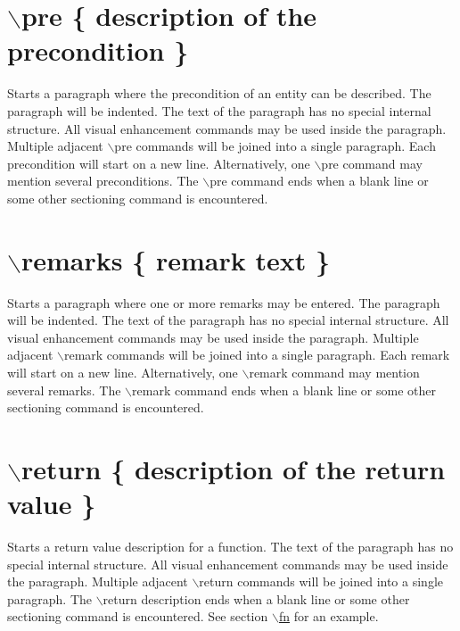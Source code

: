  \hypertarget{commands_cmdpre}{}\section{$\backslash$pre \{ description of the precondition \}}\label{commands_cmdpre}
 Starts a paragraph where the precondition of an entity can be described. The paragraph will be indented. The text of the paragraph has no special internal structure. All visual enhancement commands may be used inside the paragraph. Multiple adjacent $\backslash$pre commands will be joined into a single paragraph. Each precondition will start on a new line. Alternatively, one $\backslash$pre command may mention several preconditions. The $\backslash$pre command ends when a blank line or some other sectioning command is encountered.



 \hypertarget{commands_cmdremarks}{}\section{$\backslash$remarks \{ remark text \}}\label{commands_cmdremarks}
 Starts a paragraph where one or more remarks may be entered. The paragraph will be indented. The text of the paragraph has no special internal structure. All visual enhancement commands may be used inside the paragraph. Multiple adjacent $\backslash$remark commands will be joined into a single paragraph. Each remark will start on a new line. Alternatively, one $\backslash$remark command may mention several remarks. The $\backslash$remark command ends when a blank line or some other sectioning command is encountered.



 \hypertarget{commands_cmdreturn}{}\section{$\backslash$return \{ description of the return value \}}\label{commands_cmdreturn}
 Starts a return value description for a function. The text of the paragraph has no special internal structure. All visual enhancement commands may be used inside the paragraph. Multiple adjacent $\backslash$return commands will be joined into a single paragraph. The $\backslash$return description ends when a blank line or some other sectioning command is encountered. See section \hyperlink{commands_cmdfn}{$\backslash$fn} for an example.



